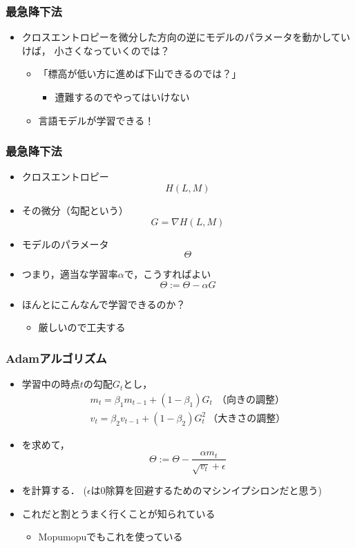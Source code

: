 \documentclass[14pt]{beamer}
\begin{document}
\begin{frame}
	\frametitle{最急降下法}

	\begin{itemize}
		\item クロスエントロピーを微分した方向の逆にモデルのパラメータを動かしていけば，
			小さくなっていくのでは？
			\begin{itemize}
				\item 「標高が低い方に進めば下山できるのでは？」
					\begin{itemize}
						\item[] \hspace{5em} {\scriptsize \color{lightgray} 遭難するのでやってはいけない}
					\end{itemize}
				\item 言語モデルが学習できる！
			\end{itemize}
	\end{itemize}
\end{frame}

\begin{frame}
	\frametitle{最急降下法}

	\begin{itemize}
		\item クロスエントロピー \[ H(L, M) \]
		\item その微分（勾配という） \[ G = \nabla H(L, M) \]
		\item モデルのパラメータ \[ \Theta \]
		\item つまり，適当な学習率$\alpha$で，こうすればよい \[ \Theta := \Theta - \alpha G \]
		\item ほんとにこんなんで学習できるのか？
			\begin{itemize}
				\item 厳しいので工夫する
			\end{itemize}
	\end{itemize}
\end{frame}

\begin{frame}
	\frametitle{Adamアルゴリズム}

	\begin{itemize}
		\item 学習中の時点$t$の勾配$G_t$とし，
			\begin{align*}
				m_t = \beta_1 m_{t-1} + (1 - \beta_1) G_t \ \ \text{（向きの調整）}\\
				v_t = \beta_2 v_{t-1} + (1 - \beta_2) G_t^2 \ \text{（大きさの調整）}
			\end{align*}
		\item[] を求めて，
			\[
				\Theta := \Theta - \frac{\alpha m_t}{\sqrt{v_t} + \epsilon}
			\]
		\item[] を計算する． {\tiny ($\epsilon$は0除算を回避するためのマシンイプシロンだと思う)}
		\item これだと割とうまく行くことが知られている
			\begin{itemize}
				\item Mopumopuでもこれを使っている
			\end{itemize}
	\end{itemize}
\end{frame}
\end{document}
